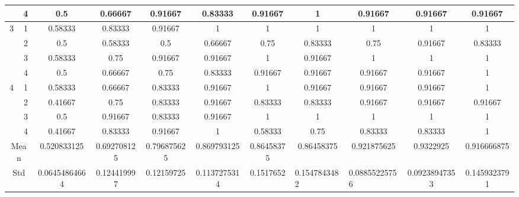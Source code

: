 \documentclass[draft,dvipsnames]{drexel-thesis}
\begin{document}
\begin{thesis}
\begin{table}[!t]
{\begin{tabular}{|c|c|c|c|c|c|c|c|c|c|c|}
                      & 4                   & 0.5           & 0.66667     & 0.91667     & 0.83333      & 0.91667    & 1                                 & 0.91667                            & 0.91667       & 0.91667      \\ \hline
\multirow{4}{*}{3}    & 1                   & 0.58333       & 0.83333     & 0.91667     & 1            & 1          & 1                                 & 1                                  & 1             & 1            \\ \cline{2-11} 
                      & 2                   & 0.5           & 0.58333     & 0.5         & 0.66667      & 0.75       & 0.83333                           & 0.75                               & 0.91667       & 0.83333      \\ \cline{2-11} 
                      & 3                   & 0.58333       & 0.75        & 0.91667     & 0.91667      & 1          & 0.91667                           & 1                                  & 1             & 1            \\ \cline{2-11} 
                      & 4                   & 0.5           & 0.66667     & 0.75        & 0.83333      & 0.91667    & 0.91667                           & 0.91667                            & 0.91667       & 1            \\ \hline
\multirow{4}{*}{4}    & 1                   & 0.58333       & 0.66667     & 0.83333     & 0.91667      & 1          & 0.91667                           & 0.91667                            & 0.91667       & 1            \\ \cline{2-11} 
                      & 2                   & 0.41667       & 0.75        & 0.83333     & 0.91667      & 0.83333    & 0.83333                           & 0.91667                            & 0.91667       & 0.91667      \\ \cline{2-11} 
                      & 3                   & 0.5           & 0.91667     & 0.83333     & 0.91667      & 1          & 1                                 & 1                                  & 1             & 1            \\ \cline{2-11} 
                      & 4                   & 0.41667       & 0.83333     & 0.91667     & 1            & 0.58333    & 0.75                              & 0.83333                            & 0.83333       & 1            \\ \hline
\multicolumn{2}{|c|}{Mean}                  & 0.520833125   & 0.692708125 & 0.796875625 & 0.869793125  & 0.86458375 & 0.86458375                        & 0.921875625                        & 0.9322925     & 0.916666875  \\ \hline
\multicolumn{2}{|c|}{Std}                   & 0.06454864664 & 0.124419997 & 0.12159725  & 0.1137275314 & 0.1517652  & \multicolumn{1}{l|}{0.1547843482} & \multicolumn{1}{l|}{0.08855225756} & 0.09238947353 & 0.1459323791 \\ \hline
\end{tabular}}
\end{table}


\end{thesis}
\end{document}
